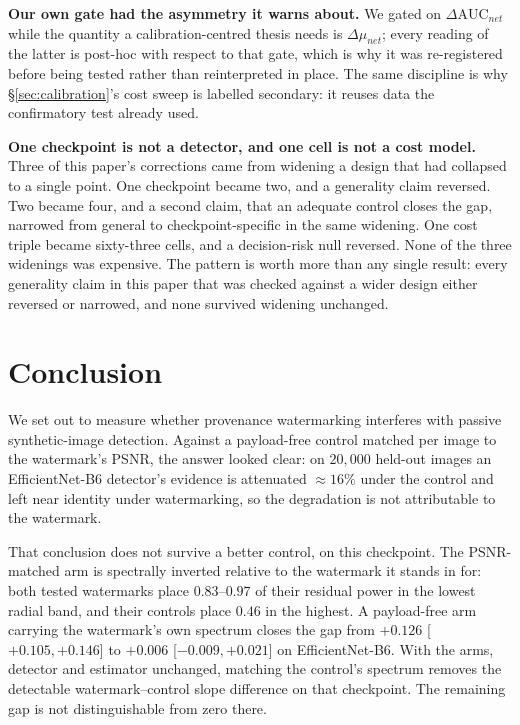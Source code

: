 \documentclass[journal]{IEEEtran}
\begin{document}
\textbf{Our own gate had the asymmetry it warns about.} We gated on
$\Delta\mathrm{AUC}_{net}$ while the quantity a calibration-centred thesis
needs is $\Delta\mu_{net}$; every reading of the latter is post-hoc with
respect to that gate, which is why it was re-registered before being tested
rather than reinterpreted in place. The same discipline is why
\S\ref{sec:calibration}'s cost sweep is labelled secondary: it reuses data the
confirmatory test already used.

\textbf{One checkpoint is not a detector, and one cell is not a cost model.}
Three of this paper's corrections came from widening a design that had
collapsed to a single point. One checkpoint became two, and a generality
claim reversed. Two became four, and a second claim, that an adequate control
closes the gap, narrowed from general to checkpoint-specific in the same
widening. One cost triple became sixty-three cells, and a decision-risk null
reversed. None of the three widenings was expensive. The pattern is worth
more than any single result: every generality claim in this paper that was
checked against a wider design either reversed or narrowed, and none survived
widening unchanged.

\section{Conclusion}

We set out to measure whether provenance watermarking interferes with passive
synthetic-image detection. Against a payload-free control matched per image to
the watermark's PSNR, the answer looked clear: on $20{,}000$ held-out images an
EfficientNet-B6 detector's evidence is attenuated $\approx16\%$ under the
control and left near identity under watermarking, so the degradation is not
attributable to the watermark.

That conclusion does not survive a better control, on this checkpoint. The
PSNR-matched arm is spectrally inverted relative to the watermark it stands
in for: both tested watermarks place $0.83$--$0.97$ of their residual power
in the lowest radial band, and their controls place $0.46$ in the highest. A
payload-free arm carrying the watermark's own spectrum closes the gap from
$+0.126$ [$+0.105,+0.146$] to $+0.006$ [$-0.009,+0.021$] on EfficientNet-B6.
With the arms, detector and estimator unchanged, matching the control's
spectrum removes the detectable watermark--control slope difference on that
checkpoint. The remaining gap is not distinguishable from zero there.
\end{document}
